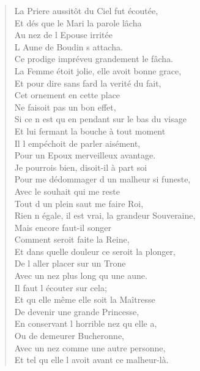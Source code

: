 \documentclass[14pt,a4paper]{memoir}
\begin{document}
{{\begin{otherlanguage}{french}
\begin{verse}
La Priere aussitôt du Ciel fut écoutée, \\
Et dés que le Mari la parole lâcha \\
\vin Au nez de l\textquotesingle{} Epouse irritée \\
\vin L\textquotesingle{} Aune de Boudin s\textquotesingle{} attacha. \\
Ce prodige impréveu grandement le fâcha. \\
La Femme étoit jolie, elle avoit bonne grace, \\
Et pour dire sans fard la verité du fait, \\
\vin Cet ornement en cette place \\
\vin Ne faisoit pas un bon effet, \\
Si ce n\textquotesingle{} est qu\textquotesingle{} en pendant sur le bas du visage \\
Et lui fermant la bouche à tout moment \\
\vin Il l\textquotesingle{} empéchoit de parler aisément, \\
\vin Pour un Epoux merveilleux avantage. \\
Je pourrois bien, disoit-il à part soi \\
Pour me dédommager d\textquotesingle{} un malheur si funeste, \\
\vin Avec le souhait qui me reste \\
\vin Tout d\textquotesingle{} un plein saut me faire Roi, \\
Rien n\textquotesingle{} égale, il est vrai, la grandeur Souveraine, \\
\vin Mais encore faut-il songer \\
\vin Comment seroit faite la Reine, \\
Et dans quelle douleur ce seroit la plonger, \\
\vin De l\textquotesingle{} aller placer sur un Trone \\
\vin Avec un nez plus long qu\textquotesingle{} une aune. \\
\vin Il faut l\textquotesingle{} écouter sur cela; \\
\vin Et qu\textquotesingle{} elle même elle soit la Maîtresse \\
\vin De devenir une grande Princesse, \\
\vin En conservant l\textquotesingle{} horrible nez qu\textquotesingle{} elle a, \\
\vin Ou de demeurer Bucheronne, \\
\vin Avec un nez comme une autre personne, \\
Et tel qu\textquotesingle{} elle l\textquotesingle{} avoit avant ce malheur-là.


\end{verse}
\end{otherlanguage}}}
\end{document}
